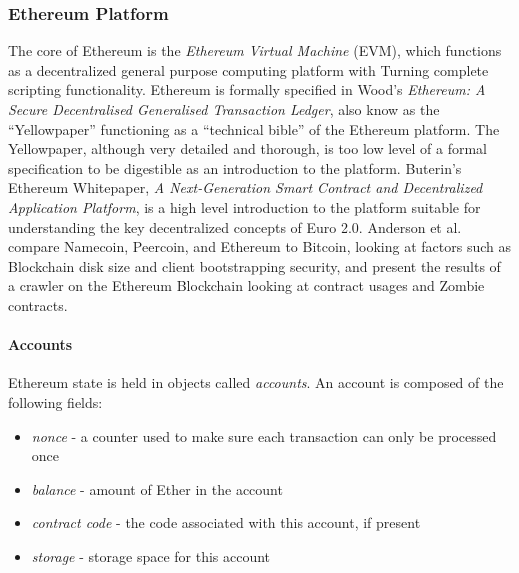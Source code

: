 \documentclass[a4paper,12pt]{article} %
\begin{document}
\subsubsection{Ethereum Platform} \label{sssec:2:ethereum:platform}

The core of Ethereum is the \textit{Ethereum Virtual Machine} (EVM), which functions as a decentralized general purpose computing platform with Turning complete scripting functionality. Ethereum is formally specified in Wood's \textit{Ethereum: A Secure Decentralised Generalised Transaction Ledger}\cite{yellowpaper}, also know as the ``Yellowpaper'' functioning as a ``technical bible'' of the Ethereum platform. The Yellowpaper, although very detailed and thorough, is too low level of a formal specification to be digestible as an introduction to the platform. Buterin's Ethereum Whitepaper, \textit{A Next-Generation Smart Contract and Decentralized Application Platform}\cite{whitepaper}, is a high level introduction to the platform suitable for understanding the key decentralized concepts of Euro 2.0.  Anderson et al. compare Namecoin, Peercoin, and Ethereum to Bitcoin, looking at factors such as Blockchain disk size and client bootstrapping security, and present the results of a crawler on the Ethereum Blockchain looking at contract usages and Zombie contracts\cite{Anderson2016NewKO}.

\paragraph*{Accounts}

Ethereum state is held in objects called \textit{accounts}. An account is composed of the following fields:

\begin{itemize}
	\item \textit{nonce} - a counter used to make sure each transaction can only be processed once
	\item \textit{balance} - amount of Ether in the account
	\item \textit{contract code} - the code associated with this account, if present
	\item \textit{storage} - storage space for this account
\end{itemize}
\end{document}
